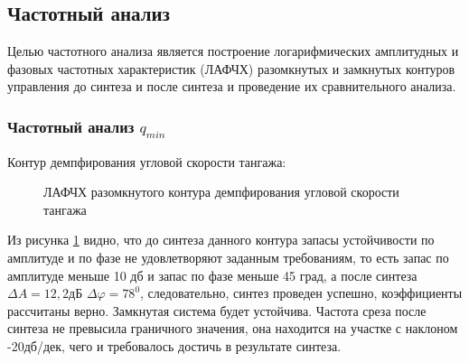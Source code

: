 \subsection{Частотный анализ}

Целью частотного анализа является построение логарифмических амплитудных и фазовых частотных характеристик (ЛАФЧХ) разомкнутых и замкнутых контуров управления до синтеза и после синтеза и проведение их сравнительного анализа.
\subsubsection{Частотный анализ $q_{min}$}

\begin{center}
    Контур демпфирования угловой скорости тангажа:
\end{center}

\begin{figure}[H]
    \caption{ЛАФЧХ разомкнутого контура демпфирования угловой скорости тангажа}
    \label{fig:Угловая скорость тангажа раз qMIN}
\end{figure}

Из рисунка \ref{fig:Угловая скорость тангажа раз qMIN} видно, что до синтеза данного контура запасы устойчивости по амплитуде и по фазе не удовлетворяют заданным требованиям, то есть запас по амплитуде меньше 10 дб и запас по фазе меньше 45 град, а после синтеза $\Delta A = 12,2 $дБ $\Delta \varphi = 78^0$, следовательно, синтез проведен успешно, коэффициенты рассчитаны верно. Замкнутая система будет устойчива. Частота среза после синтеза не превысила граничного значения, она находится на участке с наклоном -20дб/дек, чего и требовалось достичь в результате синтеза.  

